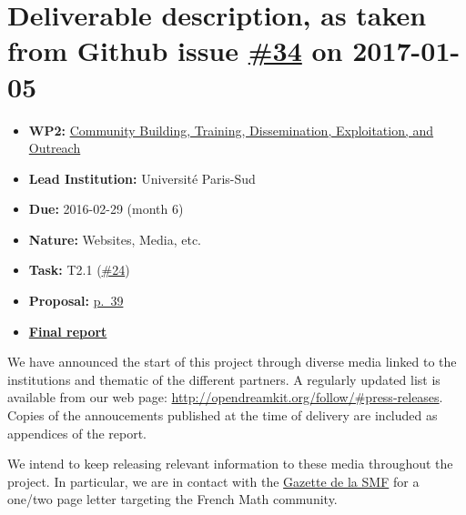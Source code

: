\section*{\texorpdfstring{Deliverable description, as taken from Github
issue
\href{https://github.com/OpenDreamKit/OpenDreamKit/issues/34}{\#34} on
2017-01-05}{Deliverable description, as taken from Github issue \#34 on 2017-01-05}}\label{deliverable-description-as-taken-from-github-issue-34-on-2017-01-05}

\begin{itemize}
\tightlist
\item
  \textbf{WP2:}
  \href{https://github.com/OpenDreamKit/OpenDreamKit/tree/master/WP2}{Community
  Building, Training, Dissemination, Exploitation, and Outreach}
\item
  \textbf{Lead Institution:} Université Paris-Sud
\item
  \textbf{Due:} 2016-02-29 (month 6)
\item
  \textbf{Nature:} Websites, Media, etc.
\item
  \textbf{Task:} T2.1
  (\href{https://github.com/OpenDreamKit/OpenDreamKit/issues/24}{\#24})
\item
  \textbf{Proposal:}
  \href{https://github.com/OpenDreamKit/OpenDreamKit/raw/master/Proposal/proposal-www.pdf}{p.~39}
\item
  \textbf{\href{https://github.com/OpenDreamKit/OpenDreamKit/raw/master/WP2/D2.1/report-final.pdf}{Final
  report}}
\end{itemize}

We have announced the start of this project through diverse media linked
to the institutions and thematic of the different partners. A regularly
updated list is available from our web page:
\url{http://opendreamkit.org/follow/\#press-releases}. Copies of the
annoucements published at the time of delivery are included as
appendices of the report.

We intend to keep releasing relevant information to these media
throughout the project. In particular, we are in contact with the
\href{http://smf.emath.fr/}{Gazette de la SMF} for a one/two page letter
targeting the French Math community.
